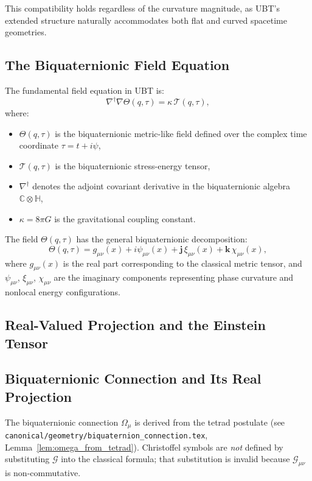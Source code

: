 This compatibility holds regardless of the curvature magnitude, as UBT's extended structure naturally accommodates both flat and curved spacetime geometries.

\subsection{The Biquaternionic Field Equation}

The fundamental field equation in UBT is:
\begin{equation}
\nabla^\dagger \nabla \Theta(q, \tau) = \kappa \, \mathcal{T}(q, \tau),
\label{eq:ubt_field_eq}
\end{equation}
where:
\begin{itemize}
  \item $\Theta(q, \tau)$ is the biquaternionic metric-like field defined over the complex time coordinate $\tau = t + i\psi$,
  \item $\mathcal{T}(q, \tau)$ is the biquaternionic stress-energy tensor,
  \item $\nabla^\dagger$ denotes the adjoint covariant derivative in the biquaternionic algebra $\mathbb{C} \otimes \mathbb{H}$,
  \item $\kappa = 8\pi G$ is the gravitational coupling constant.
\end{itemize}

The field $\Theta(q,\tau)$ has the general biquaternionic decomposition:
\begin{equation}
\Theta(q, \tau) = g_{\mu\nu}(x) + i\psi_{\mu\nu}(x) + \mathbf{j}\,\xi_{\mu\nu}(x) + \mathbf{k}\,\chi_{\mu\nu}(x),
\label{eq:theta_decomposition}
\end{equation}
where $g_{\mu\nu}(x)$ is the real part corresponding to the classical metric tensor, and $\psi_{\mu\nu}$, $\xi_{\mu\nu}$, $\chi_{\mu\nu}$ are the imaginary components representing phase curvature and nonlocal energy configurations.

\subsection{Real-Valued Projection and the Einstein Tensor}

\subsection{Biquaternionic Connection and Its Real Projection}

The biquaternionic connection $\Omega_\mu$ is derived from the tetrad postulate (see
\texttt{canonical/geometry/biquaternion\_connection.tex}, Lemma~\ref{lem:omega_from_tetrad}).
Christoffel symbols are \emph{not} defined by substituting $\mathcal{G}$ into the classical formula;
that substitution is invalid because $\mathcal{G}_{\mu\nu}$ is non-commutative.

